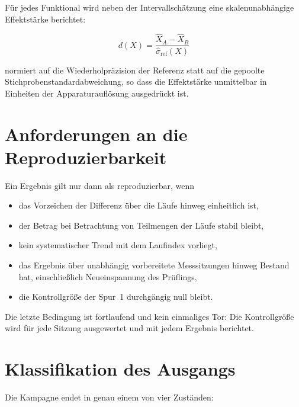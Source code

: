 \documentclass[12pt,a4paper]{report}
\begin{document}
Für jedes Funktional wird neben der Intervallschätzung eine
skalenunabhängige Effektstärke berichtet:

\begin{equation}
  d(X) = \frac{\hat{X}_A - \hat{X}_B}{\hat{\sigma}_{\mathrm{ref}}(X)}
  \label{eq:effect-size}
\end{equation}

normiert auf die Wiederholpräzision der Referenz statt auf die gepoolte
Stichprobenstandardabweichung, so dass die Effektstärke unmittelbar in
Einheiten der Apparaturauflösung ausgedrückt ist.

\section{Anforderungen an die Reproduzierbarkeit}

Ein Ergebnis gilt nur dann als reproduzierbar, wenn

\begin{itemize}
  \item das Vorzeichen der Differenz über die Läufe hinweg einheitlich
        ist,
  \item der Betrag bei Betrachtung von Teilmengen der Läufe stabil
        bleibt,
  \item kein systematischer Trend mit dem Laufindex vorliegt,
  \item das Ergebnis über unabhängig vorbereitete Messsitzungen hinweg
        Bestand hat, einschließlich Neueinspannung des Prüflings,
  \item die Kontrollgröße der Spur~1 durchgängig null bleibt.
\end{itemize}

Die letzte Bedingung ist fortlaufend und kein einmaliges Tor: Die
Kontrollgröße wird für jede Sitzung ausgewertet und mit jedem Ergebnis
berichtet.

\section{Klassifikation des Ausgangs}
\label{sec:decision-class}

Die Kampagne endet in genau einem von vier Zuständen:
\end{document}
